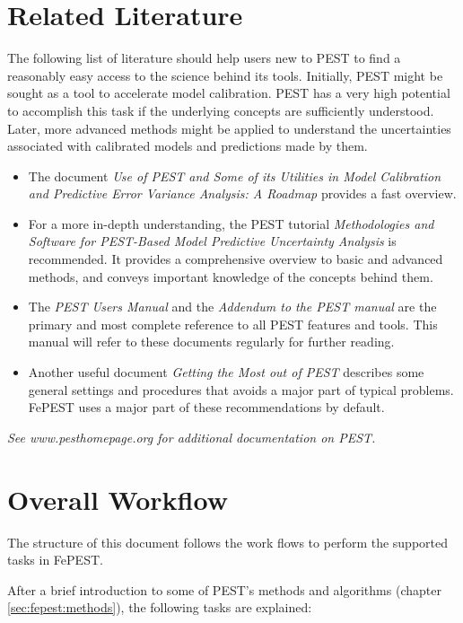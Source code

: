 \section{Related Literature}
\label{sec:fepest:literatureReview}

The following list of literature should help users new to PEST to find a reasonably easy access to the science behind its tools.
Initially, PEST might be sought as a tool to accelerate model calibration. PEST has a very high potential to accomplish this task if the underlying concepts are sufficiently understood. Later, more advanced methods might be applied to understand the uncertainties associated with calibrated models and predictions made by them.

\begin{itemize}
\item The document \textit{Use of PEST and Some of its Utilities in Model Calibration and Predictive Error Variance Analysis: A Roadmap} provides a fast overview.

\item For a more in-depth understanding, the PEST tutorial \textit{Methodologies and Software for PEST-Based Model Predictive Uncertainty Analysis} is recommended. It provides a comprehensive overview to basic and advanced methods, and conveys important knowledge of the concepts behind them.

\item The \textit{PEST Users Manual} and the \textit{Addendum to the PEST manual} are the primary and most complete reference to all PEST features and tools. This manual will refer to these documents regularly for further reading.

\item Another useful document \textit{Getting the Most out of PEST} describes some general settings and procedures that avoids a major part of typical problems. FePEST uses a major part of these recommendations by default.
\end{itemize}

\textit{See www.pesthomepage.org  for additional documentation on PEST.
}

\section{Overall Workflow}

The structure of this document follows the work flows to perform the supported tasks in FePEST. 

After a brief introduction  to some of PEST's methods and algorithms (chapter \ref{sec:fepest:methods}), the following tasks are explained: 

